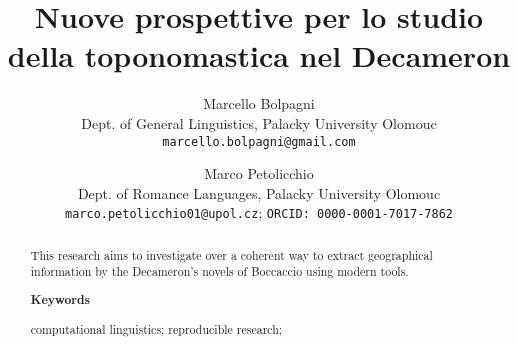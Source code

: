 \documentclass[11pt,a4paper, oneside]{article}
\begin{document}
\title{Nuove prospettive per lo studio della toponomastica nel Decameron}
\author{
  Marcello Bolpagni\\
  Dept. of General Linguistics, Palacky University Olomouc \\
  \texttt{marcello.bolpagni@gmail.com}
  \and
  Marco Petolicchio\\
  Dept. of Romance Languages, Palacky University Olomouc\\
  \texttt{marco.petolicchio01@upol.cz};
  \texttt{ORCID: 0000-0001-7017-7862}\\
}\maketitle

\begin{abstract}

This research aims to investigate over a coherent way to extract geographical information by the Decameron’s novels of Boccaccio using modern tools.

\textbf{Keywords}

computational linguistics; reproducible research; 

\end{abstract}


\tableofcontents
\newpage

\newpage
\printbibliography
\end{document}
